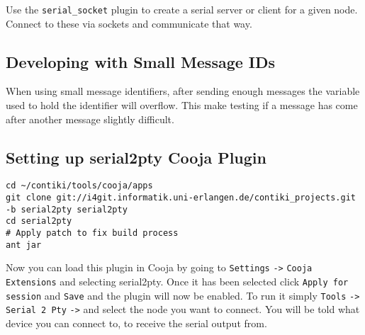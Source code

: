 Use the \verb|serial_socket| plugin to create a serial server or client for a given node. Connect to these via sockets and communicate that way.

\subsection{Developing with Small Message IDs}

When using small message identifiers, after sending enough messages the variable used to hold the identifier will overflow. This make testing if a message has come after another message slightly difficult.

\subsection{Setting up serial2pty Cooja Plugin}

\begin{listing}[H]
\begin{verbatim}
cd ~/contiki/tools/cooja/apps
git clone git://i4git.informatik.uni-erlangen.de/contiki_projects.git -b serial2pty serial2pty
cd serial2pty
# Apply patch to fix build process
ant jar
\end{verbatim}
\end{listing}

Now you can load this plugin in Cooja by going to \verb|Settings| \verb|->| \verb|Cooja Extensions| and selecting serial2pty. Once it has been selected click \verb|Apply for session| and \verb|Save| and the plugin will now be enabled. To run it simply \verb|Tools| \verb|->| \verb| Serial 2 Pty| \verb|->| and select the node you want to connect. You will be told what device you can connect to, to receive the serial output from.



